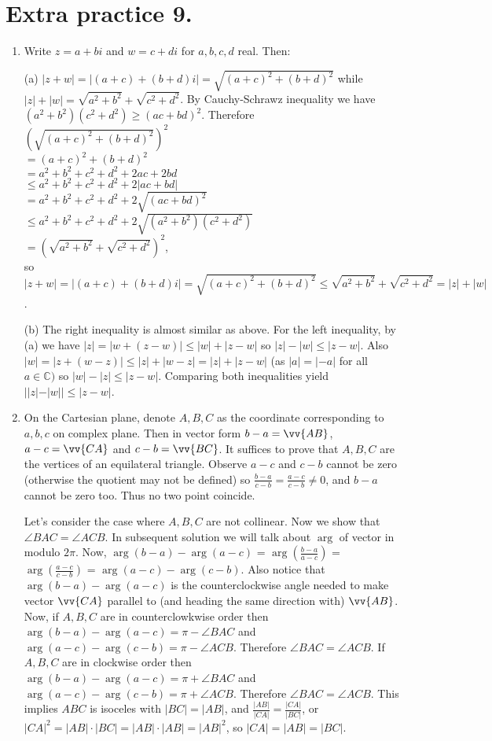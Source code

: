 \documentclass[11pt]{article}
\begin{document}
\section {Extra practice 9.}
\begin{enumerate}
\item Write $z=a+bi$ and $w=c+di$ for $a,b,c,d$ real. Then:

(a) $|z+w|=|(a+c)+(b+d)i|=\sqrt{(a+c)^2+(b+d)^2}$ while $|z|+|w|=\sqrt{a^2+b^2}+\sqrt{c^2+d^2}$. By Cauchy-Schrawz inequality we have $(a^2+b^2)(c^2+d^2)\ge (ac+bd)^2$. Therefore\\ 
$(\sqrt{(a+c)^2+(b+d)^2})^2$\\
$=(a+c)^2+(b+d)^2$\\
$=a^2+b^2+c^2+d^2+2ac+2bd$\\
$\le a^2+b^2+c^2+d^2+2|ac+bd|$\\
$= a^2+b^2+c^2+d^2+2\sqrt{(ac+bd)^2}$\\
$\le a^2+b^2+c^2+d^2+2\sqrt{(a^2+b^2)(c^2+d^2)}$\\
$=(\sqrt{a^2+b^2}+\sqrt{c^2+d^2})^2$,\\
so $|z+w|=|(a+c)+(b+d)i|=\sqrt{(a+c)^2+(b+d)^2}\le \sqrt{a^2+b^2}+\sqrt{c^2+d^2}=|z|+|w|$.

(b) The right inequality is almost similar as above. For the left inequality, by (a) we have $|z|=|w+(z-w)|\le |w|+|z-w|$ so $|z|-|w|\le |z-w|$. Also $|w|=|z+(w-z)|\le |z|+|w-z|=|z|+|z-w|$ (as $|a|=|-a|$ for all $a\in\mathbb{C})$ so $|w|-|z|\le |z-w|$. Comparing both inequalities yield $||z|-|w||\le |z-w|$.

\item On the Cartesian plane, denote $A, B, C$ as the coordinate corresponding to $a,b,c$ on complex plane. Then in vector form $b-a=\vv{AB}$, $a-c=\vv{CA}$ and $c-b=\vv{BC}$. It suffices to prove that $A, B, C$ are the vertices of an equilateral triangle. Observe $a-c$ and $c-b$ cannot be zero (otherwise the quotient may not be defined) so $\frac{b-a}{c-b}=\frac{a-c}{c-b}\neq 0$, and $b-a$ cannot be zero too. Thus no two point coincide.

Let's consider the case where $A,B,C$ are not collinear. Now we show that $\angle BAC=\angle ACB$. In subsequent solution we will talk about $\arg$ of vector in modulo $2\pi$. Now, $\arg (b-a)-\arg (a-c)$ = $\arg (\frac{b-a}{a-c})$ = $\arg (\frac{a-c}{c-b})$ = $\arg (a-c)-\arg (c-b)$. Also notice that $\arg (b-a)-\arg (a-c)$ is the counterclockwise angle needed to make vector $\vv{CA}$ parallel to (and heading the same direction with) $\vv{AB}$. Now, if $A,B,C$ are in counterclowkwise order then $\arg (b-a)-\arg (a-c)= \pi-\angle BAC$ and $\arg (a-c)-\arg (c-b)=\pi-\angle ACB$. Therefore $\angle BAC=\angle ACB$. If $A,B,C$ are in clockwise order then $\arg (b-a)-\arg (a-c)= \pi+\angle BAC$ and $\arg (a-c)-\arg (c-b)=\pi+\angle ACB$. Therefore $\angle BAC=\angle ACB$. This implies $ABC$ is isoceles with $|BC|=|AB|$, and $\frac{|AB|}{|CA|}=\frac{|CA|}{|BC|}$, or $|CA|^2=|AB|\cdot |BC|=|AB|\cdot |AB|=|AB|^2$, so $|CA|=|AB|=|BC|$. 


\end{enumerate}
\end{document}
